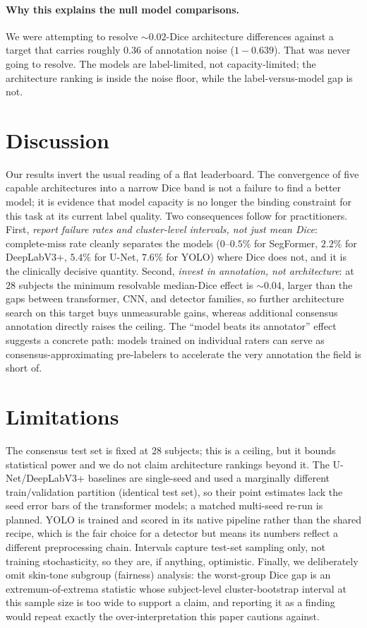 \documentclass[letterpaper,twocolumn,10pt]{article}
\begin{document}
\paragraph{Why this explains the null model comparisons.}
We were attempting to resolve $\sim0.02$-Dice architecture differences against a
target that carries roughly $0.36$ of annotation noise ($1-0.639$). That was never
going to resolve. The models are label-limited, not capacity-limited; the
architecture ranking is inside the noise floor, while the label-versus-model gap
is not.

\section{Discussion}
Our results invert the usual reading of a flat leaderboard. The convergence of
five capable architectures into a narrow Dice band is not a failure to find a
better model; it is evidence that model capacity is no longer the binding
constraint for this task at its current label quality. Two consequences follow for
practitioners. First, \emph{report failure rates and cluster-level intervals, not
just mean Dice}: complete-miss rate cleanly separates the models
($0$--$0.5\%$ for SegFormer, $2.2\%$ for DeepLabV3+, $5.4\%$ for U-Net, $7.6\%$ for
YOLO) where Dice does not, and it is the clinically decisive quantity. Second,
\emph{invest in annotation, not architecture}: at $28$ subjects the minimum
resolvable median-Dice effect is $\sim0.04$, larger than the gaps between
transformer, CNN, and detector families, so further architecture search on this
target buys unmeasurable gains, whereas additional consensus annotation directly
raises the ceiling. The ``model beats its annotator'' effect suggests a concrete
path: models trained on individual raters can serve as consensus-approximating
pre-labelers to accelerate the very annotation the field is short of.

\section{Limitations}
The consensus test set is fixed at $28$ subjects; this is a ceiling, but it bounds
statistical power and we do not claim architecture rankings beyond it. The
U-Net/DeepLabV3+ baselines are single-seed and used a marginally different
train/validation partition (identical test set), so their point estimates lack the
seed error bars of the transformer models; a matched multi-seed re-run is planned.
YOLO is trained and scored in its native pipeline rather than the shared recipe,
which is the fair choice for a detector but means its numbers reflect a different
preprocessing chain. Intervals capture test-set sampling only, not training
stochasticity, so they are, if anything, optimistic. Finally, we deliberately omit
skin-tone subgroup (fairness) analysis: the worst-group Dice gap is an
extremum-of-extrema statistic whose subject-level cluster-bootstrap interval at
this sample size is too wide to support a claim, and reporting it as a finding
would repeat exactly the over-interpretation this paper cautions against.
\end{document}

